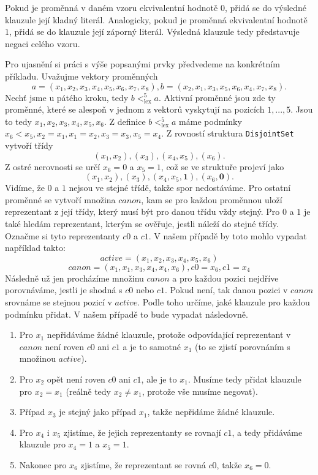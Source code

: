 Pokud je proměnná v daném vzoru ekvivalentní hodnotě $0$, přidá se do výsledné klauzule její kladný literál. Analogicky, pokud je proměnná ekvivalentní hodnotě $1$, přidá se do klauzule její záporný literál. Výsledná klauzule tedy představuje negaci celého vzoru.

\begin{prikl}
Pro ujasnění si práci s výše popsanými prvky předvedeme na konkrétním příkladu. Uvažujme vektory proměnných $$a=(x_1, x_2, x_3, x_4, x_5, x_6, x_7, x_8), b=(x_2, x_1, x_3, x_5, x_6, x_4, x_7, x_8).$$
Nechť jsme u pátého kroku, tedy $b <^5_{\text{lex}} a$. Aktivní proměnné jsou zde ty proměnné, které se alespoň v jednom z vektorů vyskytují na pozicích $1,...,5$. Jsou to tedy $x_1, x_2, x_3, x_4, x_5, x_6$. Z definice $b <^5_{\text{lex}} a$ máme podmínky $x_6<x_5, x_2=x_1,x_1=x_2,x_3=x_3,x_5=x_4$. Z rovností struktura \texttt{DisjointSet} vytvoří třídy $$(x_1, x_2), (x_3), (x_4, x_5), (x_6).$$ Z ostré nerovnosti se určí $x_6=0$ a $x_5=1$, což se ve struktuře projeví jako $$(x_1, x_2), (x_3), (x_4, x_5, \mathbf{1}), (x_6, \mathbf{0}).$$ Vidíme, že $0$ a $1$ nejsou ve stejné třídě, takže spor nedostáváme. Pro ostatní proměnné se vytvoří množina $canon$, kam se pro každou proměnnou uloží reprezentant z její třídy, který musí být pro danou třídu vždy stejný. Pro $0$ a $1$ je také hledám reprezentant, kterým se ověřuje, jestli náleží do stejné třídy. Označme si tyto reprezentanty $c0$ a $c1$. V našem případě by toto mohlo vypadat například takto: $$active = (x_1, x_2, x_3, x_4, x_5, x_6)$$ $$canon=(x_1, x_1, x_3, x_4, x_4, x_6), c0=x_6, c1=x_4$$ Následně už jen procházíme množinu $canon$ a pro každou pozici nejdříve porovnáváme, jestli je shodná s $c0$ nebo $c1$. Pokud není, tak danou pozici v $canon$ srovnáme se stejnou pozicí v $active$. Podle toho určíme, jaké klauzule pro každou podmínku přidat. V našem případě to bude vypadat následovně.
\begin{enumerate}
        \item Pro $x_1$ nepřidáváme žádné klauzule, protože odpovídající reprezentant v $canon$ není roven $c0$ ani $c1$ a je to samotné $x_1$ (to se zjistí porovnáním s množinou $active$).
        \item Pro $x_2$ opět není roven $c0$ ani $c1$, ale je to $x_1$. Musíme tedy přidat klauzule pro $x_2=x_1$ (reálně tedy $x_2\neq x_1$, protože vše musíme negovat).
        \item Případ $x_3$ je stejný jako případ $x_1$, takže nepřidáme žádné klauzule.
	\item Pro $x_4$ i $x_5$ zjistíme, že jejich reprezentanty se rovnají $c1$, a tedy přidáváme klauzule pro $x_4=1$ a $x_5=1$.
	\item Nakonec pro $x_6$ zjistíme, že reprezentant se rovná $c0$, takže $x_6=0$.
\end{enumerate} 
\end{prikl}

